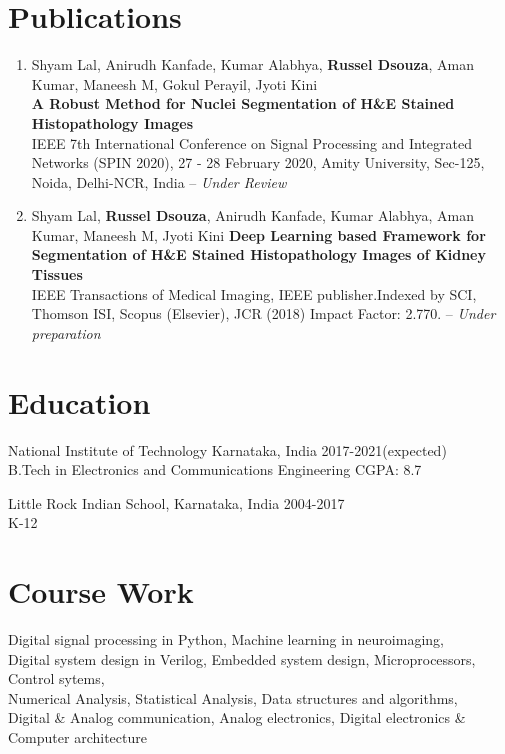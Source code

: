 \documentclass[letterpaper]{article}
\renewenvironment{itemize}{
  \begin{list}{}{
    \setlength{\leftmargin}{1.5em}
  }
}{
  \end{list}
}
\newcommand{\datefont}[1]{\textcolor{black!80}{\small{#1}}}
\begin{document}
\section*{Publications}
  \begin{enumerate}
    \item Shyam Lal, Anirudh Kanfade, Kumar Alabhya, \textbf{Russel Dsouza}, Aman Kumar, Maneesh M, Gokul Perayil, Jyoti Kini \\
    \textbf{A Robust Method for Nuclei Segmentation of H\&E Stained Histopathology Images}\\
    IEEE 7th International Conference on Signal Processing and Integrated Networks (SPIN 2020), 27 - 28 February 2020, Amity University, Sec-125, Noida, Delhi-NCR, India -- \textit{Under Review}

    \item Shyam Lal, \textbf{Russel Dsouza}, Anirudh Kanfade, Kumar Alabhya, Aman Kumar, Maneesh M, Jyoti Kini
    \textbf{Deep Learning based Framework for Segmentation of H\&E Stained Histopathology Images of Kidney Tissues}\\
    IEEE Transactions of Medical Imaging, IEEE publisher.Indexed by SCI, Thomson ISI, Scopus (Elsevier), JCR (2018) Impact Factor: 2.770. -- \textit{Under preparation}
  \end{enumerate}


\section*{Education}
  \begin{itemize}
    \item National Institute of Technology Karnataka, India\hfill
    \datefont{2017-2021(expected)}
    \\
    \datefont{B.Tech in Electronics and Communications Engineering}
    \hfill{\datefont{CGPA: 8.7}}

    \item Little Rock Indian School, Karnataka, India\hfill
    \datefont{2004-2017}
    \\
    \datefont{K-12}
  \end{itemize}



\section*{Course Work}
  \begin{itemize}
    \item  Digital signal processing in Python, Machine learning in neuroimaging, \\
    Digital system design in Verilog, Embedded system design,
    Microprocessors, Control sytems,\\
    Numerical Analysis, Statistical Analysis, Data structures and algorithms, \\
    Digital \& Analog communication, Analog electronics, Digital electronics \& Computer architecture
  \end{itemize}
\end{document}
